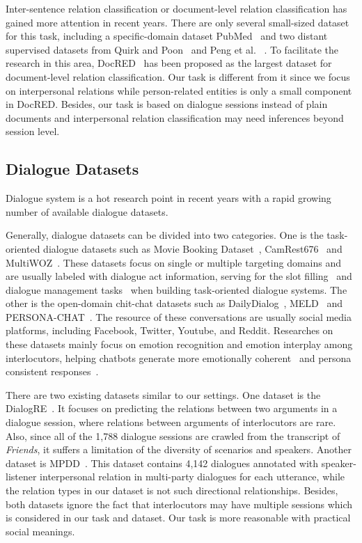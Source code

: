 \documentclass[letterpaper]{article} \usepackage{aaai21}  \usepackage{times}  \usepackage{helvet} \usepackage{courier}  \usepackage[hyphens]{url}  \usepackage{graphicx} \usepackage{xcolor}
\begin{document}
Inter-sentence relation classification or document-level relation classification has gained more attention in recent years. There are only several small-sized dataset for this task, including a specific-domain dataset PubMed~\cite{LiSJSWLDMWL16} and two distant supervised datasets from Quirk and Poon~ and Peng et al. ~. To facilitate the research in this area, DocRED~\cite{YaoYLHLLLHZS19} has been proposed as the largest dataset for document-level relation classification. Our task is different from it since we focus on interpersonal relations while person-related entities is only a small component in DocRED. Besides, our task is based on dialogue sessions instead of plain documents and interpersonal relation classification may need inferences beyond session level.

\subsection{Dialogue Datasets}
Dialogue system is a hot research point in recent years with a rapid growing number of available dialogue datasets. 

Generally, dialogue datasets can be divided into two categories. 
One is the task-oriented dialogue datasets such as Movie Booking Dataset~\cite{LiCLGC17}, CamRest676~\cite{UltesRSVKCBMWGY17} and MultiWOZ~\cite{BudzianowskiWTC18}. These datasets focus on single or multiple targeting domains and are usually labeled with dialogue act information, serving for the slot filling~\cite{LiuWXF20} and dialogue management tasks~\cite{BudzianowskiV19} when building task-oriented dialogue systems.
The other is the open-domain chit-chat datasets such as DailyDialog~\cite{LiSSLCN17}, MELD~\cite{PoriaHMNCM19} and PERSONA-CHAT~\cite{KielaWZDUS18}. The resource of these conversations are usually social media platforms, including Facebook, Twitter, Youtube, and Reddit. Researches on these datasets mainly focus on emotion recognition and emotion interplay among interlocutors, helping chatbots generate more emotionally coherent~\cite{GhosalMPCG19} and persona consistent responses~\cite{ZhengZHM20}.

There are two existing datasets similar to our settings. One dataset is the DialogRE~\cite{YaoYLHLLLHZS19}. It focuses on predicting the relations between two arguments in a dialogue session, where relations between arguments of interlocutors are rare. Also, since all of the 1,788 dialogue sessions are crawled from the transcript of \textit{Friends}, it suffers a limitation of the diversity of scenarios and speakers. Another dataset is MPDD~\cite{ChenHC20}. This dataset contains 4,142 dialogues annotated with speaker-listener interpersonal relation in multi-party dialogues for each utterance, while the relation types in our dataset is not such directional relationships. Besides, both datasets ignore the fact that interlocutors may have multiple sessions which is considered in our task and dataset. Our task is more reasonable with practical social meanings.
\end{document}
